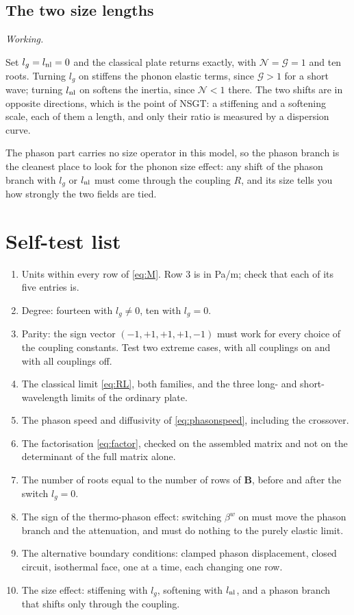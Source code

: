 \documentclass[11pt,a4paper]{article}
\newif\ifshowworked \showworkedtrue
\newenvironment{worked}{\ifshowworked\par\smallskip\noindent\textit{Working.}\par\else\setbox0\vbox\bgroup\fi}{\ifshowworked\par\smallskip\else\egroup\fi}
\newcommand{\Nc}{\mathcal{N}}
\newcommand{\Gc}{\mathcal{G}}
\newcommand{\bwth}{\beta^{w}}
\begin{document}
\subsection{The two size lengths}

\begin{worked}
Set $l_g=l_{\rm nl}=0$ and the classical plate returns exactly, with $\Nc=\Gc=1$ and ten roots. Turning $l_g$
on stiffens the phonon elastic terms, since $\Gc>1$ for a short wave; turning $l_{\rm nl}$ on softens the
inertia, since $\Nc<1$ there. The two shifts are in opposite directions, which is the point of NSGT: a
stiffening and a softening scale, each of them a length, and only their ratio is measured by a dispersion
curve.
\end{worked}

\noindent The phason part carries no size operator in this model, so the phason branch is the cleanest place
to look for the phonon size effect: any shift of the phason branch with $l_g$ or $l_{\rm nl}$ must come
through the coupling $R$, and its size tells you how strongly the two fields are tied.

\section{Self-test list}\label{sec:tests}

\begin{enumerate}
\item Units within every row of \eqref{eq:M}. Row 3 is in Pa/m; check that each of its five entries is.
\item Degree: fourteen with $l_g\ne0$, ten with $l_g=0$.
\item Parity: the sign vector $(-1,+1,+1,+1,-1)$ must work for every choice of the coupling constants. Test
two extreme cases, with all couplings on and with all couplings off.
\item The classical limit \eqref{eq:RL}, both families, and the three long- and short-wavelength limits of
the ordinary plate.
\item The phason speed and diffusivity of \eqref{eq:phasonspeed}, including the crossover.
\item The factorisation \eqref{eq:factor}, checked on the assembled matrix and not on the determinant of the
full matrix alone.
\item The number of roots equal to the number of rows of $\mathbf B$, before and after the switch $l_g=0$.
\item The sign of the thermo-phason effect: switching $\bwth$ on must move the phason branch and the
attenuation, and must do nothing to the purely elastic limit.
\item The alternative boundary conditions: clamped phason displacement, closed circuit, isothermal face, one
at a time, each changing one row.
\item The size effect: stiffening with $l_g$, softening with $l_{\rm nl}$, and a phason branch that shifts
only through the coupling.
\end{enumerate}
\end{document}
